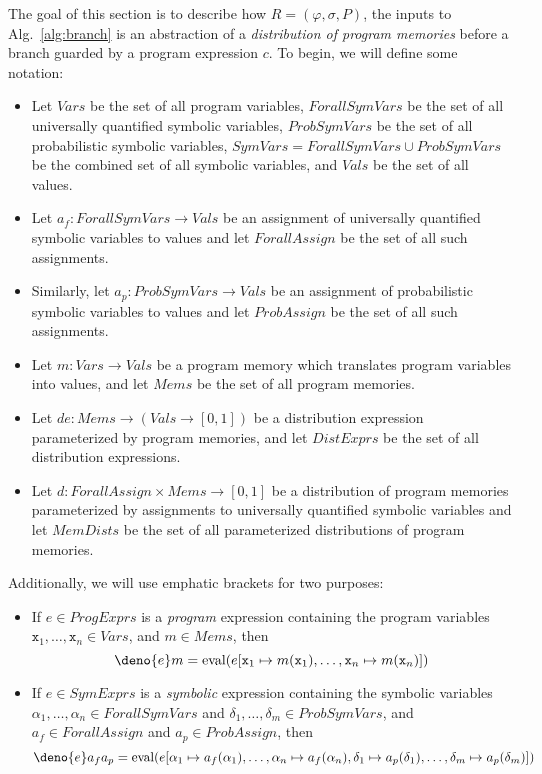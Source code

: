 \documentclass[acmsmall]{acmart}\settopmatter{}
\begin{document}
	The goal of this section is to describe how $R=(\varphi,\sigma,P)$, the inputs to Alg.~\ref{alg:branch} is an abstraction of a \textit{distribution of program memories} before a branch guarded by a program expression $c$.
	To begin, we will define some notation:
	\begin{itemize}
		\item Let $Vars$ be the set of all program variables, $ForallSymVars$ be the set of all universally quantified symbolic variables, $ProbSymVars$ be the set of all probabilistic symbolic variables, $SymVars = ForallSymVars \cup ProbSymVars$ be the combined set of all symbolic variables, and $Vals$ be the set of all values. 
		\item Let $a_f: ForallSymVars \rightarrow Vals$ be an assignment of universally quantified symbolic variables to values and let $ForallAssign$ be the set of all such assignments.
		\item Similarly, let $a_p : ProbSymVars \rightarrow Vals$ be an assignment of probabilistic symbolic variables to values and let $ProbAssign$ be the set of all such assignments.
		\item Let $m : Vars \rightarrow Vals$ be a program memory which translates program variables into values, and let $Mems$ be the set of all program memories.
		\item Let $de : Mems \rightarrow (Vals \rightarrow [0,1])$ be a distribution expression parameterized by program memories, and let $DistExprs$ be the set of all distribution expressions.
		\item Let $d : ForallAssign \times Mems \rightarrow [0,1]$ be a distribution of program memories parameterized by assignments to universally quantified symbolic variables and let $MemDists$ be the set of all parameterized distributions of program memories.
	\end{itemize}
	
	Additionally, we will use emphatic brackets for two purposes:
	\begin{itemize}
		\item If $e \in ProgExprs$ is a \textit{program} expression containing the program variables $\mathtt{x}_1,\ldots,\mathtt{x}_n \in Vars$, and $m \in Mems$, then
		\[
		\deno{e}m = \text{eval}(e[\mathtt{x}_1 \mapsto m(\mathtt{x}_1),\ldots,\mathtt{x}_n \mapsto m(\mathtt{x}_n)])
		\]
		\item If $e \in SymExprs$ is a \textit{symbolic} expression containing the symbolic variables $\alpha_1,\ldots,\alpha_n \in ForallSymVars$ and $\delta_1,\ldots,\delta_m \in ProbSymVars$, and $a_f \in ForallAssign$ and $a_p \in ProbAssign$, then
		\[
		\deno{e}a_fa_p = \text{eval}(e[\alpha_1\mapsto a_f(\alpha_1),\ldots,\alpha_n \mapsto a_f(\alpha_n), \delta_1 \mapsto a_p(\delta_1), \ldots, \delta_m \mapsto a_p(\delta_m)])
		\]
	\end{itemize}
	
\end{document}
